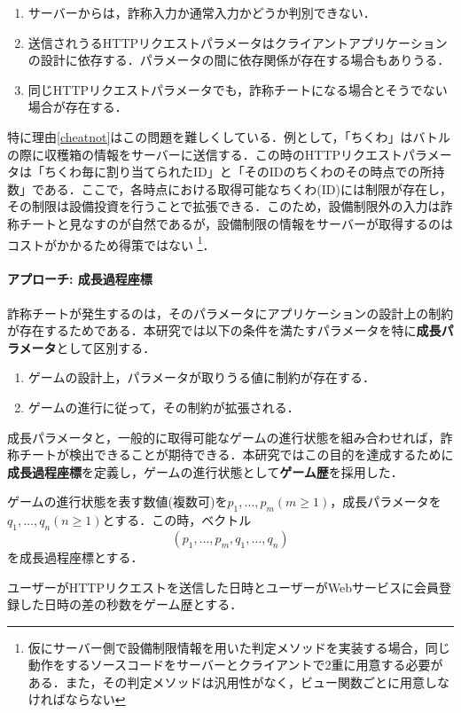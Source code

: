 \begin{enumerate}
\item
サーバーからは，詐称入力か通常入力かどうか判別できない．
\item
送信されうるHTTPリクエストパラメータはクライアントアプリケーションの設計に依存する．パラメータの間に依存関係が存在する場合もありうる．
\item \label{cheatnot}
同じHTTPリクエストパラメータでも，詐称チートになる場合とそうでない場合が存在する．
\end{enumerate}

特に理由\ref{cheatnot}はこの問題を難しくしている．例として，「ちくわ」はバトルの際に収穫箱の情報をサーバーに送信する．この時のHTTPリクエストパラメータは「ちくわ毎に割り当てられたID」と「そのIDのちくわのその時点での所持数」である．ここで，各時点における取得可能なちくわ(ID)には制限が存在し，その制限は設備投資を行うことで拡張できる．このため，設備制限外の入力は詐称チートと見なすのが自然であるが，設備制限の情報をサーバーが取得するのはコストがかかるため得策ではない
\footnote{仮にサーバー側で設備制限情報を用いた判定メソッドを実装する場合，同じ動作をするソースコードをサーバーとクライアントで2重に用意する必要がある．また，その判定メソッドは汎用性がなく，ビュー関数ごとに用意しなければならない}．

\paragraph{アプローチ: 成長過程座標}
詐称チートが発生するのは，そのパラメータにアプリケーションの設計上の制約が存在するためである．本研究では以下の条件を満たすパラメータを特に{\bf 成長パラメータ}として区別する．

\begin{enumerate}
\item
ゲームの設計上，パラメータが取りうる値に制約が存在する．
\item
ゲームの進行に従って，その制約が拡張される．
\end{enumerate}

成長パラメータと，一般的に取得可能なゲームの進行状態を組み合わせれば，詐称チートが検出できることが期待できる．本研究ではこの目的を達成するために{\bf 成長過程座標}を定義し，ゲームの進行状態として{\bf ゲーム歴}を採用した．

\begin{mathdef}[成長過程座標]
ゲームの進行状態を表す数値(複数可)を$p_1, \dots, p_m (m \geq 1)$，成長パラメータを$q_1, \dots, q_n (n \geq 1)$とする．この時，ベクトル \[
(p_1, \dots, p_m, q_1, \dots, q_n)
\] を成長過程座標とする．
\end{mathdef}

\begin{mathdef}[ゲーム歴]
ユーザーがHTTPリクエストを送信した日時とユーザーがWebサービスに会員登録した日時の差の秒数をゲーム歴とする．
\end{mathdef}

